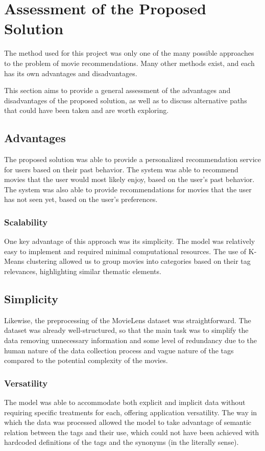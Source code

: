 \section{Assessment of the Proposed Solution}

The method used for this project was only one of the many possible approaches to the problem of movie recommendations. Many other methods exist, and each has its own advantages and disadvantages. 

This section aims to provide a general assessment of the advantages and disadvantages of the proposed solution, as well as to discuss alternative paths that could have been taken and are worth exploring.

\subsection{Advantages}
The proposed solution was able to provide a personalized recommendation service for users based on their past behavior. The system was able to recommend movies that the user would most likely enjoy, based on the user's past behavior. The system was also able to provide recommendations for movies that the user has not seen yet, based on the user's preferences.

\subsubsection{Scalability}
One key advantage of this approach was its simplicity. The model was relatively easy to implement and required minimal computational resources. The use of K-Means clustering allowed us to group movies into categories based on their tag relevances, highlighting similar thematic elements. 

\subsection{Simplicity}
Likewise, the preprocessing of the MovieLens dataset was straightforward. The dataset was already well-structured, so that the main task was to simplify the data removing unnecessary information and some level of redundancy due to the human nature of the data collection process and vague nature of the tags compared to the potential complexity of the movies.

\subsubsection{Versatility}
The model was able to accommodate both explicit and implicit data without requiring specific treatments for each, offering application versatility. The way in which the data was processed allowed the model to take advantage of semantic relation between the tags and their use, which could not have been achieved with hardcoded definitions of the tags and the synonyms (in the literally sense).

